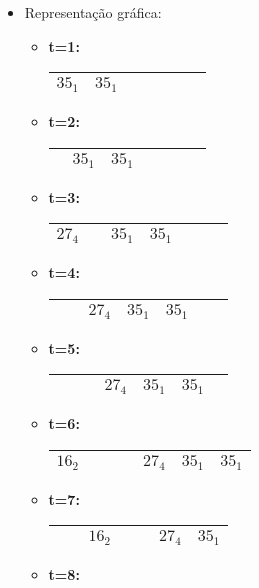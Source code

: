 \begin{enumerate}
\begin{itemize}
    \item Representação gráfica:

    \begin{itemize}
        \item \textbf{t=1:} \begin{tabular}{|p{1cm}|p{1cm}|p{1cm}|p{1cm}|p{1cm}|p{1cm}|p{1cm}|}
            \hline $35_1$&$35_1$& & & & &\\ \hline \end{tabular}
        \item \textbf{t=2:} \begin{tabular}{|p{1cm}|p{1cm}|p{1cm}|p{1cm}|p{1cm}|p{1cm}|p{1cm}|}
            \hline &$35_1$& $35_1$& & & &\\ \hline \end{tabular}
        \item \textbf{t=3:} \begin{tabular}{|p{1cm}|p{1cm}|p{1cm}|p{1cm}|p{1cm}|p{1cm}|p{1cm}|}
            \hline $27_4$& & $35_1$&$35_1$ & & &\\ \hline \end{tabular}
        \item \textbf{t=4:} \begin{tabular}{|p{1cm}|p{1cm}|p{1cm}|p{1cm}|p{1cm}|p{1cm}|p{1cm}|}
            \hline & & $27_4$& $35_1$& $35_1$& &\\ \hline \end{tabular}
        \item \textbf{t=5:} \begin{tabular}{|p{1cm}|p{1cm}|p{1cm}|p{1cm}|p{1cm}|p{1cm}|p{1cm}|}
            \hline & & & $27_4$& $35_1$& $35_1$&\\ \hline \end{tabular} 
        \item \textbf{t=6:} \begin{tabular}{|p{1cm}|p{1cm}|p{1cm}|p{1cm}|p{1cm}|p{1cm}|p{1cm}|}
            \hline $16_2$& & & & $27_4$& $35_1$& $35_1$ \\ \hline \end{tabular} 
        \item \textbf{t=7:} \begin{tabular}{|p{1cm}|p{1cm}|p{1cm}|p{1cm}|p{1cm}|p{1cm}|p{1cm}|}
            \hline & &$16_2$ & & & $27_4$& $35_1$ \\ \hline \end{tabular} 
        \item \textbf{t=8:} \begin{tabular}{|p{1cm}|p{1cm}|p{1cm}|p{1cm}|p{1cm}|p{1cm}|p{1cm}|}

\end{tabular}
\end{itemize}
\end{itemize}
\end{enumerate}
